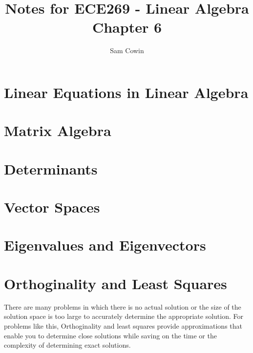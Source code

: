 \documentclass[12pt]{article}
\begin{document}
\setlength{\abovedisplayskip}{0pt}
\setlength{\belowdisplayskip}{0pt}
\setlength{\abovedisplayshortskip}{0pt}
\setlength{\belowdisplayshortskip}{0pt}

\title{Notes for ECE269 - Linear Algebra \\
\large Chapter 6}
\author{Sam Cowin}
\maketitle

\section{Linear Equations in Linear Algebra}
\section{Matrix Algebra}
\section{Determinants}
\section{Vector Spaces}
\section{Eigenvalues and Eigenvectors}
\section{Orthoginality and Least Squares}
There are many problems in which there is no actual solution or the size of the solution space is too large to accurately determine the appropriate solution. For problems like this, 
Orthoginality and least squares provide approximations that enable you to determine close solutions while saving on the time or the complexity of determining exact solutions. 
\end{document}
